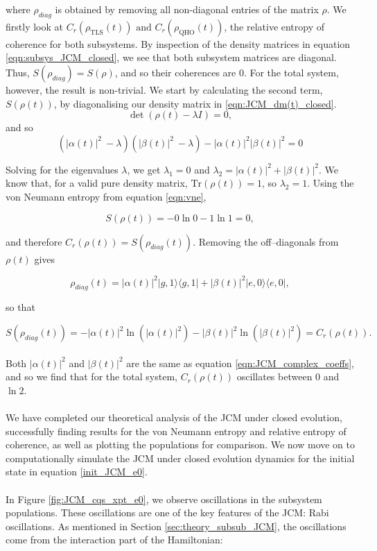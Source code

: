 \documentclass[11pt]{article}
\begin{document}
where $\rho_{diag}$ is obtained by removing all non-diagonal entries of the matrix $\rho$. We firstly look at $C_r(\rho_{\scriptscriptstyle \text{TLS}}(t)) \text{ and }  C_r(\rho_{\scriptscriptstyle \text{QHO}}(t))$, the relative entropy of coherence for both subsystems. By inspection of the density matrices in equation \eqref{eqn:subsys_JCM_closed}, we see that both subsystem matrices are diagonal. Thus, $S(\rho_{diag}) = S(\rho)$, and so their coherences are $0$. For the total system, however, the result is non-trivial. We start by calculating the second term, $S(\rho(t))$, by diagonalising our density matrix in \eqref{eqn:JCM_dm(t)_closed}.
\begin{equation*}
    \det(\rho(t) - \lambda I) = 0,
\end{equation*}
and so 
\begin{equation*}
    \left(|\alpha(t)|^2\ - \lambda\right) \left(|\beta(t)|^2\ - \lambda \right) - |\alpha(t)|^2|\beta(t)|^2 =0
\end{equation*}

Solving for the eigenvalues $\lambda$, we get $\lambda_1 = 0$ and $\lambda_2 = |\alpha(t)|^2 + |\beta(t)|^2$. We know that, for a valid pure density matrix, $\text{Tr}(\rho(t)) = 1$, so $\lambda_2 = 1$. Using the von Neumann entropy from equation \eqref{eqn:vne},

\begin{equation*}
    S(\rho(t)) = - 0 \ln0 - 1\ln1 = 0, 
\end{equation*}

and therefore $C_r(\rho(t)) = S(\rho_{diag}(t))$. Removing the off--diagonals from $\rho(t)$ gives

\begin{equation*}
    \rho_{diag}(t) = |\alpha(t)|^2|g,1\rangle\langle g,1| + |\beta(t)|^2|e,0\rangle\langle e,0|,
\end{equation*}

so that

\begin{equation*}
    S(\rho_{diag}(t)) = - |\alpha(t)|^2\ln(|\alpha(t)|^2) - |\beta(t)|^2\ln(|\beta(t)|^2) = C_r(\rho(t)).
\end{equation*}
\\
Both $|\alpha(t)|^2$ and $|\beta(t)|^2$ are the same as equation \eqref{eqn:JCM_complex_coeffs}, and so we find that for the total system, $C_r(\rho(t))$
oscillates between $0$ and $\ln2$.\\
\\
We have completed our theoretical analysis of the JCM under closed evolution, successfully finding results for the von Neumann entropy and relative entropy of coherence, as well as plotting the populations for comparison. We now move on to computationally simulate the JCM under closed evolution dynamics for the initial state in equation \ref{init_JCM_e0}.\\
\\
In Figure \ref{fig:JCM_cqs_xpt_e0}, we observe oscillations in the subsystem populations. These oscillations are one of the key features of the JCM: Rabi oscillations. As mentioned in Section \ref{sec:theory_subsub_JCM}, the oscillations come from the interaction part of the Hamiltonian:
\end{document}
